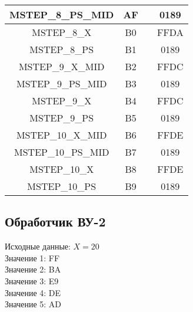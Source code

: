 \begin{center}
\begin{tabular}{|c|c|c|c|}
		MSTEP\_8\_PS\_MID & AF &  & 0189 \\\hline
		MSTEP\_8\_X & B0 &  & FFDA \\\hline
		MSTEP\_8\_PS & B1 &  & 0189 \\\hline
		MSTEP\_9\_X\_MID & B2 &  & FFDC \\\hline
		MSTEP\_9\_PS\_MID & B3 &  & 0189 \\\hline
		MSTEP\_9\_X & B4 &  & FFDC \\\hline
		MSTEP\_9\_PS & B5 &  & 0189 \\\hline
		MSTEP\_10\_X\_MID & B6 &  & FFDE \\\hline
		MSTEP\_10\_PS\_MID & B7 &  & 0189 \\\hline
		MSTEP\_10\_X & B8 &  & FFDE \\\hline
		MSTEP\_10\_PS & B9 &  & 0189 \\\hline
		\hline
	\end{tabular}
\end{center}

\newpage
\subsection{Обработчик ВУ-2}
\noindent Исходные данные: $ X = 20 $\\
Значение 1: FF\\
Значение 2: BA\\
Значение 3: E9\\
Значение 4: DE\\
Значение 5: AD\\


